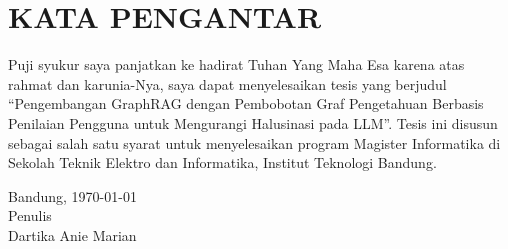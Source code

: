 \chapter*{KATA PENGANTAR}

Puji syukur saya panjatkan ke hadirat Tuhan Yang Maha Esa karena atas rahmat dan karunia-Nya, saya dapat menyelesaikan tesis yang berjudul ``Pengembangan GraphRAG dengan Pembobotan Graf Pengetahuan Berbasis Penilaian Pengguna untuk Mengurangi Halusinasi pada LLM''. Tesis ini disusun sebagai salah satu syarat untuk menyelesaikan program Magister Informatika di Sekolah Teknik Elektro dan Informatika, Institut Teknologi Bandung.

\begin{flushright}
    Bandung, \today\\[0.5cm]
    Penulis\\
    \vspace{1cm}
    Dartika Anie Marian
\end{flushright}